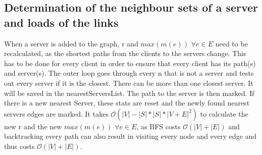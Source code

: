 \documentclass [12pt]{article}
\begin{document}
    \subsection{Determination of the neighbour sets of a server and loads of the links}
    When a server is added to the graph, r and $max(m(e))$ $\forall e\in E $ need to be recalculated, as the shortest paths from the clients
    to the servers change. This has to be done for every client in order to ensure that every client has its path(s) and server(s).
    The outer loop goes through every n that is not a server and tests out every server if it is the closest. There can be more than one 
    closest server. It will be saved in the nearestServersList. The path to the server is then marked. If there is a new nearest Server, these
    stats are reset and the newly found nearest servers edges are marked.
    It takes $\mathcal O(|V|-|S| * |S| * |V+E|^2 ) $ to calculate the new r and the new $max(m(e))$ $\forall e\in E$, as BFS costs $ \mathcal O(|V| + |E|) $
    and backtracking every path can also result in visiting every node and every edge and thus costs $\mathcal O(|V| + |E|)$.
\end{document}

